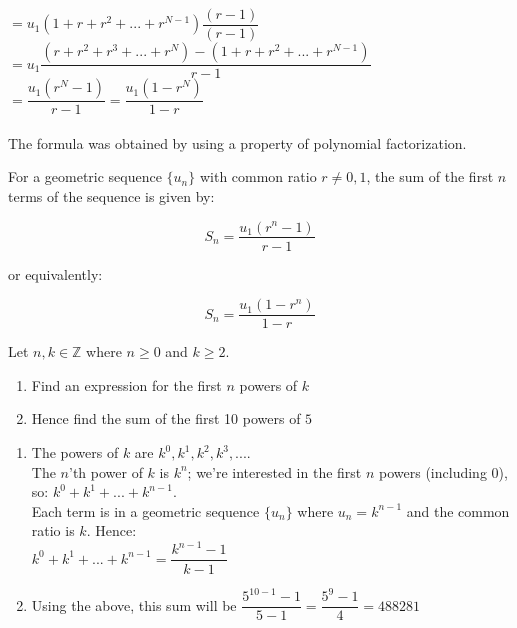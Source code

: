 \documentclass[12pt, a4paper, titlepage, twoside]{article}
\newcommand*{\Z}{\mathbb{Z}}
\newcounter{excount}[subsection]
\begin{document}
	$= u_1 (1 + r + r^2 + ... + r^{N-1}) \dfrac{(r-1)}{(r-1)}$\\
	
	$=  u_1 \dfrac{(r + r^2 + r^3 + ... + r^N) - (1 + r + r^2 + ... + r^{N-1})}{r-1}$\\
	
	$=  \dfrac{u_1 (r^N - 1)}{r-1} = \dfrac{u_1 (1 - r^N)}{1-r}$
	
	\paragraph{}
	The formula was obtained by using a property of polynomial factorization.\\
	
	\begin{kp}
		For a geometric sequence $\{u_n\}$ with common ratio $r \neq 0,1$, the sum of the first $n$ terms of the sequence is given by:
		
		$$S_n = \dfrac{u_1 (r^n - 1)}{r-1}$$
		
		or equivalently:
		
		$$S_n = \dfrac{u_1 (1 - r^n)}{1-r}$$
	\end{kp}
	
	\hfill
	
	\begin{ex}
		Let $n, k \in \Z$ where $n \geqslant 0$ and $k \geqslant 2$.
		\begin{enumerate}[label=\textbf{(\alph*)}]
			\item Find an expression for the first $n$ powers of $k$
			\item Hence find the sum of the first 10 powers of $5$
		\end{enumerate}
		
		\hfill
		\tcbline
		\hfill
		
		\begin{enumerate}[label=\textbf{(\alph*)}]
			\item The powers of $k$ are $k^0, k^1, k^2, k^3, ...$. \\ The $n$'th power of $k$ is $k^n$; we're interested in the
			first $n$ powers (including 0), so: $k^0 + k^1 + ... + k^{n-1}$. \\ 
			
			Each term is in a geometric sequence $\{u_n\}$ where $u_n = k^{n-1}$ and the common ratio is $k$. Hence:\\
			
			$k^0 + k^1 + ... + k^{n-1} = \dfrac{k^{n-1} - 1}{k-1}$\\
			
			\item Using the above, this sum will be $\dfrac{5^{10 -1} - 1}{5-1} = \dfrac{5^9 - 1}{4} = \num{488 281}$
		\end{enumerate}	
		
	\end{ex}
	
\end{document}
